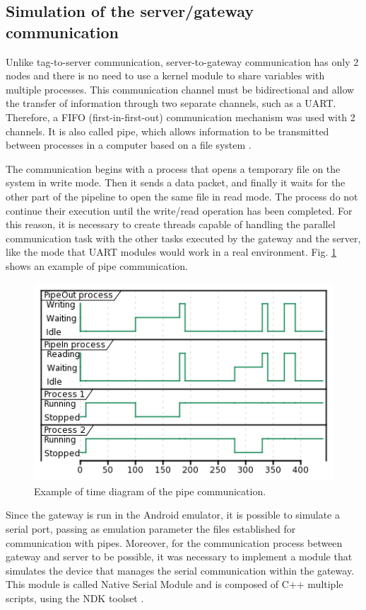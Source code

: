 \documentclass[journal]{IEEEtran}	%
\begin{document}
\subsection{Simulation of the server/gateway communication}


Unlike tag-to-server communication, server-to-gateway communication has only 2 nodes and there is no need to use a kernel module to share variables with multiple processes. This communication channel must be bidirectional and allow the transfer of information through two separate channels, such as a UART. Therefore, a FIFO (first-in-first-out) communication mechanism was used with 2 channels. It is also called pipe, which allows information to be transmitted between processes in a computer based on a file system \cite{fifo}.

The communication begins with a process that opens a temporary file on the system in write mode. Then it sends a data packet, and finally it waits for the other part of the pipeline to open the same file in read mode. The process do not continue their execution until the write/read operation has been completed. For this reason, it is necessary to create threads capable of handling the parallel communication task with the other tasks executed by the gateway and the server, like the mode that UART modules would work in a real environment. Fig. \ref{fig:pipe} shows an example of pipe communication.

\begin{figure}[t!]
\centering
\includegraphics[width=0.95\columnwidth]{pipe.png}
\caption{Example of time diagram of the pipe communication.}
\label{fig:pipe}
\end{figure}

Since the gateway is run in the Android emulator, it is possible to simulate a serial port, passing as emulation parameter the files established for communication with pipes. Moreover, for the communication process between gateway and server to be possible, it was necessary to implement a module that simulates the device that manages the serial communication within the gateway. This module is called Native Serial Module and is composed of C++ multiple scripts, using the NDK toolset \cite{NDK}.
\end{document}

